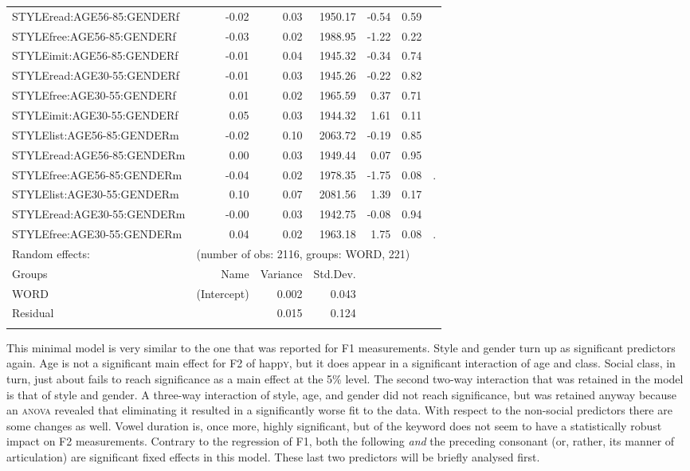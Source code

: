 {\begin{longtable}[c]{p{}rrrrrl}
		STYLEread:AGE56-85:GENDERf & -0.02 & 0.03 & 1950.17 & -0.54 & 0.59 & \\ 
		STYLEfree:AGE56-85:GENDERf & -0.03 & 0.02 & 1988.95 & -1.22 & 0.22 & \\ 
		STYLEimit:AGE56-85:GENDERf & -0.01 & 0.04 & 1945.32 & -0.34 & 0.74 & \\ 
		STYLEread:AGE30-55:GENDERf & -0.01 & 0.03 & 1945.26 & -0.22 & 0.82 & \\ 
		STYLEfree:AGE30-55:GENDERf & 0.01 & 0.02 & 1965.59 & 0.37 & 0.71 & \\ 
		STYLEimit:AGE30-55:GENDERf & 0.05 & 0.03 & 1944.32 & 1.61 & 0.11 & \\ 
		STYLElist:AGE56-85:GENDERm & -0.02 & 0.10 & 2063.72 & -0.19 & 0.85 & \\ 
		STYLEread:AGE56-85:GENDERm & 0.00 & 0.03 & 1949.44 & 0.07 & 0.95 & \\ 
		STYLEfree:AGE56-85:GENDERm & -0.04 & 0.02 & 1978.35 & -1.75 & 0.08 & .\\ 
		STYLElist:AGE30-55:GENDERm & 0.10 & 0.07 & 2081.56 & 1.39 & 0.17 & \\ 
		STYLEread:AGE30-55:GENDERm & -0.00 & 0.03 & 1942.75 & -0.08 & 0.94 & \\ 
		STYLEfree:AGE30-55:GENDERm & 0.04 & 0.02 & 1963.18 & 1.75 & 0.08 & .\\ 
		\midrule 
		Random effects: & \multicolumn{6}{l}{(number of obs: 2116, groups: WORD, 221)} \\
		Groups &         Name & Variance &      Std.Dev. & & & \\
		WORD &  (Intercept) & 0.002 & 0.043 & & & \\
		Residual  &         & 0.015 & 0.124 & & & \\
		\lspbottomrule
	\end{longtable}
}

This minimal model is very similar to the one that was reported for F1 measurements.
Style and gender turn up as significant predictors again.
Age is not a significant main effect for F2 of happ\textsc{y}, but it does appear in a significant interaction of age and class.
Social class, in turn, just about fails to reach significance as a main effect at the 5\% level.
The second two-way interaction that was retained in the model is that of style and gender.
A three-way interaction of style, age, and gender did not reach significance, but was retained anyway because an \textsc{anova} revealed that eliminating it resulted in a significantly worse fit to the data.
With respect to the non-social predictors there are some changes as well.
Vowel duration is, once more, highly significant, but  of the keyword does not seem to have a statistically robust impact on F2 measurements.
Contrary to the regression of F1, both the following \emph{and} the preceding consonant (or, rather, its manner of articulation) are significant fixed effects in this model.
These last two predictors will be briefly analysed first.

